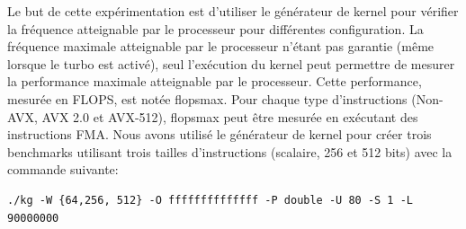     
    Le but de cette expérimentation est d'utiliser le générateur de kernel pour vérifier la fréquence atteignable par le processeur pour différentes configuration. La fréquence maximale atteignable par le processeur n'étant pas garantie (même lorsque le turbo est activé), seul l'exécution du kernel peut permettre de mesurer la performance maximale atteignable par le processeur. Cette performance, mesurée en \gls{FLOPS}, est notée \gls{flopsmax}. Pour chaque type d'instructions (Non-AVX, AVX 2.0 et AVX-512), \gls{flopsmax} peut être mesurée en exécutant des instructions \gls{FMA}. Nous avons utilisé le générateur de kernel pour créer trois benchmarks utilisant trois tailles d'instructions (scalaire, 256 et 512 bits) avec la commande suivante:\\
\begin{minipage}{0.97\linewidth}         \begin{lstlisting}
./kg -W {64,256, 512} -O ffffffffffffff -P double -U 80 -S 1 -L 90000000
\end{lstlisting} \end{minipage}\\


    
    

